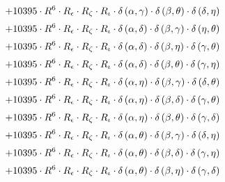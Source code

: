 \begin{subequations}
\begin{gather}
 \\[0.2em] \notag 		 + 10395 \cdot R^{6} \cdot R_{\epsilon{}} \cdot R_{\zeta{}} \cdot R_{\iota{}} \cdot \delta{}\left(\alpha{}, \gamma{}\right) \cdot \delta{}\left(\beta{}, \theta{}\right) \cdot \delta{}\left(\delta{}, \eta{}\right) 
 \\[0.2em] \notag 		 + 10395 \cdot R^{6} \cdot R_{\epsilon{}} \cdot R_{\zeta{}} \cdot R_{\iota{}} \cdot \delta{}\left(\alpha{}, \delta{}\right) \cdot \delta{}\left(\beta{}, \gamma{}\right) \cdot \delta{}\left(\eta{}, \theta{}\right) 
 \\[0.2em] \notag 		 + 10395 \cdot R^{6} \cdot R_{\epsilon{}} \cdot R_{\zeta{}} \cdot R_{\iota{}} \cdot \delta{}\left(\alpha{}, \delta{}\right) \cdot \delta{}\left(\beta{}, \eta{}\right) \cdot \delta{}\left(\gamma{}, \theta{}\right) 
 \\[0.2em] \notag 		 + 10395 \cdot R^{6} \cdot R_{\epsilon{}} \cdot R_{\zeta{}} \cdot R_{\iota{}} \cdot \delta{}\left(\alpha{}, \delta{}\right) \cdot \delta{}\left(\beta{}, \theta{}\right) \cdot \delta{}\left(\gamma{}, \eta{}\right) 
 \\[0.2em] \notag 		 + 10395 \cdot R^{6} \cdot R_{\epsilon{}} \cdot R_{\zeta{}} \cdot R_{\iota{}} \cdot \delta{}\left(\alpha{}, \eta{}\right) \cdot \delta{}\left(\beta{}, \gamma{}\right) \cdot \delta{}\left(\delta{}, \theta{}\right) 
 \\[0.2em] \notag 		 + 10395 \cdot R^{6} \cdot R_{\epsilon{}} \cdot R_{\zeta{}} \cdot R_{\iota{}} \cdot \delta{}\left(\alpha{}, \eta{}\right) \cdot \delta{}\left(\beta{}, \delta{}\right) \cdot \delta{}\left(\gamma{}, \theta{}\right) 
 \\[0.2em] \notag 		 + 10395 \cdot R^{6} \cdot R_{\epsilon{}} \cdot R_{\zeta{}} \cdot R_{\iota{}} \cdot \delta{}\left(\alpha{}, \eta{}\right) \cdot \delta{}\left(\beta{}, \theta{}\right) \cdot \delta{}\left(\gamma{}, \delta{}\right) 
 \\[0.2em] \notag 		 + 10395 \cdot R^{6} \cdot R_{\epsilon{}} \cdot R_{\zeta{}} \cdot R_{\iota{}} \cdot \delta{}\left(\alpha{}, \theta{}\right) \cdot \delta{}\left(\beta{}, \gamma{}\right) \cdot \delta{}\left(\delta{}, \eta{}\right) 
 \\[0.2em] \notag 		 + 10395 \cdot R^{6} \cdot R_{\epsilon{}} \cdot R_{\zeta{}} \cdot R_{\iota{}} \cdot \delta{}\left(\alpha{}, \theta{}\right) \cdot \delta{}\left(\beta{}, \delta{}\right) \cdot \delta{}\left(\gamma{}, \eta{}\right) 
 \\[0.2em] \notag 		 + 10395 \cdot R^{6} \cdot R_{\epsilon{}} \cdot R_{\zeta{}} \cdot R_{\iota{}} \cdot \delta{}\left(\alpha{}, \theta{}\right) \cdot \delta{}\left(\beta{}, \eta{}\right) \cdot \delta{}\left(\gamma{}, \delta{}\right) 

\end{gather}
\end{subequations}
